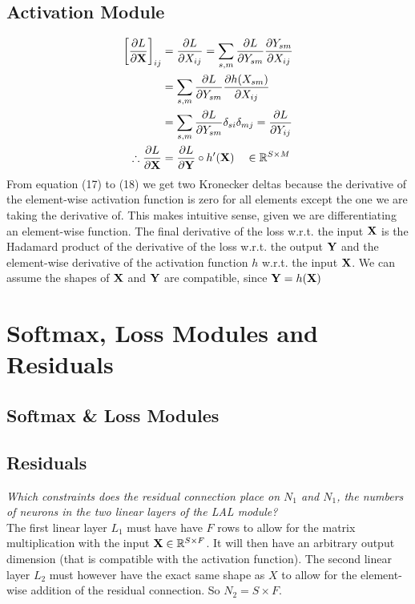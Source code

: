 \documentclass[a4paper]{article}
\begin{document}
\subsection{Activation Module} %
\begin{align}
   \left[ \frac{\partial L}{\partial \mathbf{X}} \right]_{ij} &= \frac{\partial L}{\partial X_{ij}} = \sum_{s,m} \frac{\partial L}{\partial Y_{sm}} \frac{\partial Y_{sm}}{\partial X_{ij}} \\
   &= \sum_{s,m} \frac{\partial L}{\partial Y_{sm}} \frac{\partial h(X_{sm})}{\partial X_{ij}} \\
   &= \sum_{s,m} \frac{\partial L}{\partial Y_{sm}} \delta_{si} \delta_{mj} = \frac{\partial L}{\partial Y_{ij}} \\
   \therefore \frac{\partial L}{\partial \mathbf{X}} &= \frac{\partial L}{\partial \mathbf{Y}} \circ h'(\mathbf{X}) \quad \in \mathbb{R}^{S \times M}
\end{align}
From equation (17) to (18) we get two Kronecker deltas because the derivative of the element-wise activation function
is zero for all elements except the one we are taking the derivative of. This makes intuitive sense, given we are
differentiating an element-wise function. The final derivative of the loss w.r.t. the input $\mathbf{X}$ is the Hadamard
product of the derivative of the loss w.r.t. the output $\mathbf{Y}$ and the element-wise derivative of the activation
function $h$ w.r.t. the input $\mathbf{X}$. We can assume the shapes of $\mathbf{X}$ and $\mathbf{Y}$ are compatible, since $\mathbf{Y}=h(\mathbf{X})$
\bigskip

\section{Softmax, Loss Modules and Residuals}

\subsection{Softmax \& Loss Modules} %
\bigskip

\subsection{Residuals} %
\textit{Which constraints does the residual connection place on $N_1$ and $N_1$, the numbers of neurons in the two linear layers of the LAL module?}\\
The first linear layer $L_1$ must have have $F$ rows to allow for the matrix multiplication with the input $\mathbf{X} \in \mathbb{R}^{S \times F}$.
It will then have an arbitrary output dimension (that is compatible with the activation function). The second linear layer $L_2$ must however have
the exact same shape as $X$ to allow for the element-wise addition of the residual connection. So $N_2 = S \times F$.
\bigskip
\end{document}
